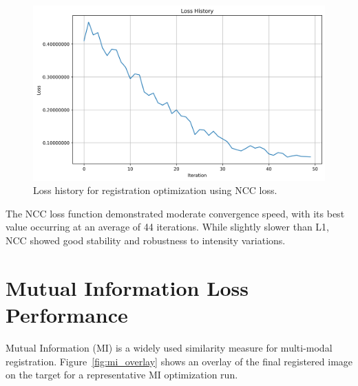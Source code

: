 \begin{figure}[htpb]
  \centering
  \includegraphics[scale=0.65]{figures/ncc/loss_history.png}
  \caption[Loss history for NCC optimization]{Loss history for registration optimization using NCC loss.}
  \label{fig:ncc_history}
\end{figure}

The NCC loss function demonstrated moderate convergence speed, with its best value occurring at an average of 44 iterations. While slightly slower than L1, NCC showed good stability and robustness to intensity variations.

\section{Mutual Information Loss Performance}

Mutual Information (MI) is a widely used similarity measure for multi-modal registration. Figure~\ref{fig:mi_overlay} shows an overlay of the final registered image on the target for a representative MI optimization run.

